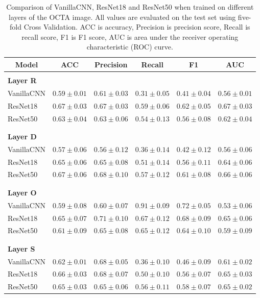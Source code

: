 \documentclass{article} %
\begin{document}
\begin{table}[h]
   \caption{Comparison of VanillaCNN, ResNet18 and ResNet50 when trained on different layers of the OCTA image. All values are evaluated on the test set using five-fold Cross Validation. ACC is accuracy, Precision is precision score, Recall is recall score, F1 is F1 score, AUC is area under the receiver operating characteristic (ROC) curve.}
   \label{model-evaluation-table-random}
   \begin{center}
   \begin{tabular}{llllll}
   \multicolumn{1}{c}{\bf Model}  &\multicolumn{1}{c}{\bf ACC} &\multicolumn{1}{c}{\bf Precision} &\multicolumn{1}{c}{\bf Recall} &\multicolumn{1}{c}{\bf F1} &\multicolumn{1}{c}{\bf AUC}
   \\ \hline \\
   \bf Layer R\\
   VanillaCNN        &$0.59\pm0.01$ &$0.61\pm0.03$ &$0.31\pm0.05$ &$0.41\pm0.04$ &$0.56\pm0.01$\\
   ResNet18         &$0.67\pm0.03$ &$0.67\pm0.03$ &$0.59\pm0.06$ &$0.62\pm0.05$ &$\mathbf{0.67\pm0.03}$\\
   ResNet50         &$0.63\pm0.04$ &$0.63\pm0.06$ &$0.54\pm0.13$ &$0.56\pm0.08$ &$0.62\pm0.04$\\
   \\ \hline \\
   \bf Layer D\\
   VanillaCNN &$0.57\pm0.06$ &$0.56\pm0.12$ &$0.36\pm0.14$ &$0.42\pm0.12$ &$0.56\pm0.06$\\
   ResNet18   &$0.65\pm0.06$ &$0.65\pm0.08$ &$0.51\pm0.14$ &$0.56\pm0.11$ &$0.64\pm0.06$\\
   ResNet50   &$0.67\pm0.06$ &$0.68\pm0.10$ &$0.57\pm0.12$ &$0.61\pm0.08$ &$\mathbf{0.66\pm0.06}$\\
   \\ \hline \\
   \bf Layer O\\
   VanillaCNN &$0.59\pm0.08$ &$0.60\pm0.07$ &$0.91\pm0.09$ &$0.72\pm0.05$ &$0.53\pm0.06$\\
   ResNet18 &$0.65\pm0.07$ &$0.71\pm0.10$ &$0.67\pm0.12$ &$0.68\pm0.09$ &$\mathbf{0.65\pm0.06}$\\
   ResNet50 &$0.61\pm0.09$ &$0.65\pm0.08$ &$0.65\pm0.12$ &$0.64\pm0.10$ &$0.59\pm0.09$\\
   \\ \hline \\
   \bf Layer S\\
   VanillaCNN &$0.62\pm0.01$ &$0.68\pm0.05$ &$0.36\pm0.10$ &$0.46\pm0.09$ &$0.61\pm0.02$\\
   ResNet18 &$0.66\pm0.03$ &$0.68\pm0.07$ &$0.50\pm0.10$ &$0.56\pm0.07$ &$\mathbf{0.65\pm0.03}$\\
   ResNet50 &$0.65\pm0.03$ &$0.65\pm0.06$ &$0.56\pm0.11$ &$0.58\pm0.07$ &${0.65\pm0.02}$\\
   \end{tabular}
   \end{center}
\end{table}
\end{document}
